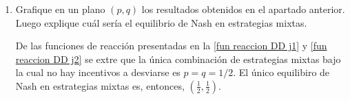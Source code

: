 \documentclass{exam}
\begin{document}
\begin{enumerate}[resume*]
\begin{solution}
\begin{equation}
\begin{array}{ll}
             \end{array} \right.
                 \label{fun reaccion DD j1}
             \end{equation}
 Si hacemos el mismo análisis para J2 podemos escribir la función de reacción como:           
             \begin{equation}
             p(q)= \left\{ \begin{array}{ll}
             {[}0,1{]} &  \text{si} \quad q = \frac{1}{2} \\
             1 & \text{si} \quad q<\frac{1}{2}\\
             0 & \text{si} \quad q>\frac{1}{2}\\
             
             \end{array} \right.
                 \label{fun reaccion DD j2}
             \end{equation}
    


    \end{solution}
    
    \item Grafique en un plano $(p, q)$ los resultados obtenidos en el apartado anterior. Luego explique cuál sería el equilibrio de Nash en estrategias mixtas.
    \begin{solution}
        De las funciones de reacción presentadas en la \autoref{fun reaccion DD j1} y \autoref{fun reaccion DD j2} se extre que la única combinación de estrategias mixtas bajo la cual no hay incentivos a desviarse es $p=q=1/2$. El único equilibiro de Nash en estrategias mixtas es, entonces, $\left(\frac{1}{2},\frac{1}{2} \right).$
        
        
      \begin{center}
          
  
\begin{tikzpicture}[x=0.75pt,y=0.75pt,yscale=-1,xscale=1]


\end{tikzpicture}
\end{center}
\end{solution}
\end{enumerate}
\end{document}
